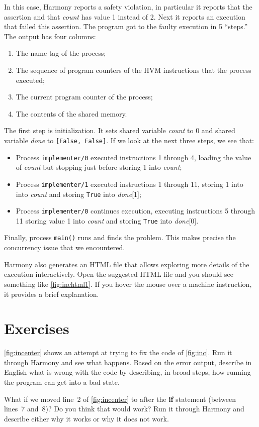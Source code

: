 \documentclass{report}
\begin{document}
In this case, Harmony reports a safety violation, in particular it
reports that the assertion and that
\textit{count} has value 1 instead of 2.
Next it reports an execution that failed this assertion.
The program got to the faulty execution in 5 ``steps.''
The output has
four columns:
\begin{enumerate}
\item The name tag of the process;
\item The sequence of program counters of the HVM instructions that the process executed;
\item The current program counter of the process;
\item The contents of the shared memory.
\end{enumerate}

The first step is initialization.
It sets shared variable \textit{count} to 0 and
shared variable \textit{done} to \texttt{[False, False]}.
If we look at the next three steps, we see that:
\begin{itemize}
\item Process \texttt{implementer/0}
executed instructions 1 through 4, loading the value of
\textit{count} but stopping just before storing 1 into \textit{count};
\item Process \texttt{implementer/1}
executed instructions 1 through 11, storing 1 into
into \textit{count} and storing \texttt{True} into \textit{done}[1];
\item Process \texttt{implementer/0}
continues execution, executing instructions 5 through 11
storing value 1 into \textit{count}
and storing \texttt{True} into \textit{done}[0].
\end{itemize}
Finally, process \texttt{main()} runs and finds the problem.
This makes precise the concurrency issue that we encountered.

Harmony also generates an HTML file that allows exploring more details
of the execution interactively.
Open the suggested HTML file and you should see something like
\autoref{fig:inchtml1}.
If you hover the mouse over a machine instruction, it provides a
brief explanation.

\section*{Exercises}

\begin{problems}
\item \autoref{fig:incenter} shows an attempt at trying to fix the code of
    \autoref{fig:inc}.  Run it through Harmony and see what happens.  Based on
    the error output, describe in English what is wrong with the code by describing,
    in broad steps, how running the program can get into a bad state.
\item What if we moved line~2 of \autoref{fig:incenter} to after the \textbf{if}
    statement (between lines~7 and~8)?  Do you think that would work?  Run it through
    Harmony and describe either why it works or why it does not work.
\end{problems}
\end{document}
